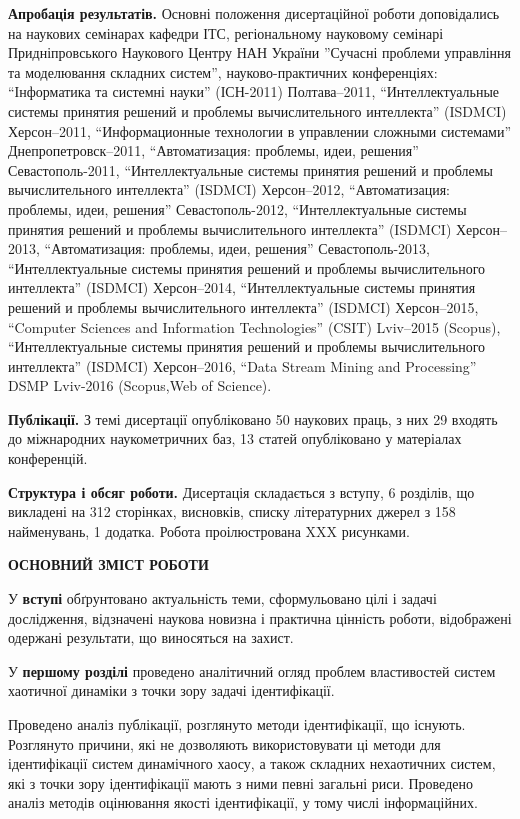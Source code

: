 \documentclass[a4paper,13pt]{atuaref}
\newcommand{\xsect}[1]{\vspace{0.15ex}\begin{center}\textbf{#1}\end{center}\vspace{4pt}\penalty10000}
\begin{document}
\smallskip
\textbf{Апробація результатів.}
Основні положення дисертаційної роботи доповідались на наукових
семінарах кафедри ІТС,
регіональному науковому семінарі Придніпровського Наукового Центру НАН України
''Сучасні проблеми управління та моделювання складних систем'',
науково-практичних конференціях:
``Інформатика та системні науки'' (ІСН-2011) Полтава--2011,
``Интеллектуальные системы принятия решений и проблемы вычислительного интеллекта'' (ISDMCI) Херсон--2011,
``Информационные технологии в управлении сложными системами'' Днепропетровск--2011,
``Автоматизация: проблемы, идеи, решения'' Севастополь-2011,
``Интеллектуальные системы принятия решений и проблемы вычислительного интеллекта'' (ISDMCI) Херсон--2012,
``Автоматизация: проблемы, идеи, решения'' Севастополь-2012,
``Интеллектуальные системы принятия решений и проблемы вычислительного интеллекта'' (ISDMCI) Херсон--2013,
``Автоматизация: проблемы, идеи, решения'' Севастополь-2013,
``Интеллектуальные системы принятия решений и проблемы вычислительного интеллекта'' (ISDMCI) Херсон--2014,
``Интеллектуальные системы принятия решений и проблемы вычислительного интеллекта'' (ISDMCI) Херсон--2015,
``Computer Sciences and Information Technologies'' (CSIT) Lviv--2015 (Scopus),
``Интеллектуальные системы принятия решений и проблемы вычислительного интеллекта'' (ISDMCI) Херсон--2016,
``Data Stream Mining and Processing'' DSMP Lviv-2016 (Scopus,Web of Science).

\smallskip
\textbf{Публікації.}
З темі дисертації опубліковано
50 наукових праць,
з них
29 входять до міжнародних наукометричних баз,
13 статей опубліковано у матеріалах конференцій.

\smallskip
\textbf{Структура і обсяг роботи.}
Дисертація складається з вступу, 6 розділів, що викладені на
312 сторінках, висновків, списку літературних джерел з
158 найменувань,
1 додатка.
Робота проілюстрована XXX рисунками.


\xsect{ОСНОВНИЙ ЗМІСТ РОБОТИ}

У \textbf{вступі} обґрунтовано актуальність теми,
сформульовано цілі і задачі дослідження,
відзначені наукова новизна і практична цінність роботи, відображені
одержані результати, що виносяться на захист.

У \textbf{першому розділі}
проведено аналітичний огляд проблем
властивостей систем хаотичної динаміки
з точки зору задачі ідентифікації.

Проведено аналіз публікації, розглянуто методи ідентифікації, що існують.
Розглянуто причини, які не дозволяють використовувати ці методи для
ідентифікації систем динамічного хаосу, а також складних нехаотичних систем, які
з точки зору ідентифікації мають з ними певні загальні риси.  Проведено аналіз
методів оцінювання якості ідентифікації, у тому числі інформаційних.
\end{document}

